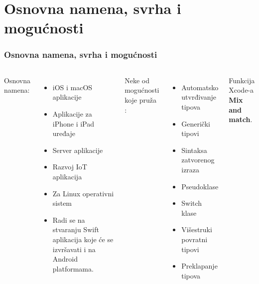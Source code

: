 \documentclass{beamer}
\begin{document}
\section{Osnovna namena, svrha i mogućnosti}
\begin{frame}
\frametitle{Osnovna namena, svrha i mogućnosti}
\begin{columns}[t]

Osnovna namena:
\begin{itemize}
\item iOS i macOS aplikacije
\item Aplikacije za iPhone i iPad uređaje
\item Server aplikacije
\item Razvoj IoT aplikacija
\item Za Linux operativni sistem
\item Radi se na
stvaranju Swift aplikacija koje će se izvršavati i na Android platformama.
\end{itemize}

Neke od mogućnosti koje pruža \cite{mastering_swift3}:
\begin{itemize}
\item{Automatsko utvrđivanje tipova}
\item{Generički tipovi}
\item{Sintaksa zatvorenog izraza}
\item{Pseudoklase}
\item{Switch klase}
\item{Višestruki povratni tipovi}
\item{Preklapanje tipova}
\end{itemize}
Funkcija Xcode-a \textbf{Mix and match}.

\end{columns}
\end{frame}
\end{document}
